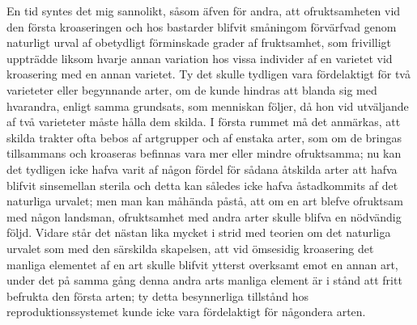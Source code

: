 En tid syntes det mig sannolikt, såsom äfven för andra, att ofruktsamheten vid den första kroaseringen och hos bastarder blifvit småningom förvärfvad genom naturligt urval af obetydligt förminskade grader af fruktsamhet, som frivilligt uppträdde liksom hvarje annan variation hos vissa individer af en varietet vid kroasering med en annan varietet. Ty det skulle tydligen vara fördelaktigt för två varieteter eller begynnande arter, om de kunde hindras att blanda sig med hvarandra, enligt samma grundsats, som menniskan följer, då hon vid utväljande af två varieteter måste hålla dem skilda. I första rummet må det anmärkas, att skilda trakter ofta bebos af artgrupper och af enstaka arter, som om de bringas tillsammans och kroaseras befinnas vara mer eller mindre ofruktsamma; nu kan det tydligen icke hafva varit af någon fördel för sådana åtskilda arter att hafva blifvit sinsemellan sterila och detta kan således icke hafva åstadkommits af det naturliga urvalet; men man kan måhända påstå, att om en art blefve ofruktsam med någon landsman, ofruktsamhet med andra arter skulle blifva en nödvändig följd. Vidare står det nästan lika mycket i strid med teorien om det naturliga urvalet som med den särskilda skapelsen, att vid ömsesidig kroasering det manliga elementet af en art skulle blifvit ytterst overksamt emot en annan art, under det på samma gång denna andra arts manliga element är i stånd att fritt befrukta den första arten; ty detta besynnerliga tillstånd hos reproduktionssystemet kunde icke vara fördelaktigt för någondera arten.


